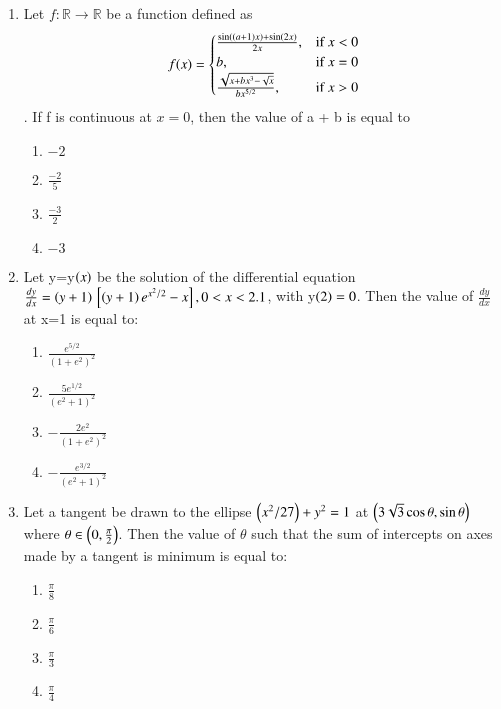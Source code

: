\documentclass[journal,12pt,twocolumn]{IEEEtran}
\theoremstyle{remark}
\begin{document}
\begin{enumerate}[start=16]
\begin{enumerate}
\end{enumerate}
\item Let $f : \mathbb{R} \to \mathbb{R}$ be a function defined as 
\begin{equation}
       f(x) = 
\begin{cases} 
\frac{\sin((a+1)x) + \sin(2x)}{2x}, & $if $  x < 0 \\ 
b, & $if $ x = 0 \\ 
\frac{\sqrt{x + bx^{3} - \sqrt{x}}}{bx^{5/2}}, & $if $ x > 0 
\end{cases}
\end{equation}
. If f is continuous at $ x = 0$, then the value of a + b is equal to
\begin{enumerate}
    \item $-2$
    \item $\frac{-2}{5}$
    \item $\frac{-3}{2}$
    \item $-3$
\end{enumerate}
\item Let y=y$\left(x\right)$ be the solution of the differential equation $\frac{dy}{dx}=\left(y+1\right){}\left[\left(y+1\right)e^{x^2/2}-x\right] ,0<x<2.1
$, with y$\left(2\right)=0$. Then the value of $\frac{dy}{dx}$ at x=1 is equal to:
\begin{enumerate}
\item $\frac{e^{5/2}}{(1 + e^{2})^{2}} $
\item $ \frac{5 e^{1/2}}{(e^{2} + 1)^{2}} $
\item $ -\frac{2 e^{2}}{(1 + e^{2})^{2}} $
\item $ -\frac{e^{3/2}}{(e^{2} + 1)^{2}} $
\end{enumerate}
\item Let a tangent be drawn to the ellipse $\left(x^2/27\right)+y^2=1$ at $\left(3\sqrt{3} \cos \theta, \sin \theta\right) \quad $where $ \theta \in \left(0, \frac{\pi}{2}\right)$.  Then the value of $\theta$ such that the sum of intercepts on axes made by a tangent is minimum is equal to:
\begin{enumerate}
    \item $\frac{\pi}{8}$
    \item $\frac{\pi}{6}$
    \item $\frac{\pi}{3}$
    \item $\frac{\pi}{4}$
\end{enumerate}

\end{enumerate}
\end{document}
